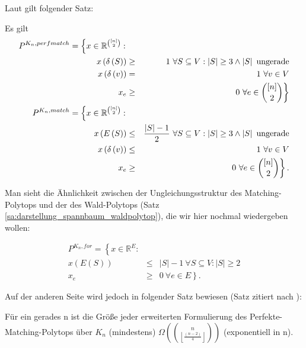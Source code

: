 \documentclass[10p,a4paper,BCOR = 12mm, DIV=15]{scrbook}
\begin{document}
Laut \citep{schrijver2003combinatorial} gilt folgender Satz:

\begin{Sa}
Es gilt
\begin{eqnarray*}
P^{K_n, perfmatch} = \left\{ x \in \mathbb{R}^{\left[n\right] \choose 2}: \right. \\
x\left(\delta\left(S\right)\right) & \geq & 1\ \forall S \subseteq V: \left|S\right| \geq 3 \wedge \left|S\right| \textnormal{ ungerade} \\
x\left(\delta\left(v\right)\right) & = & 1\ \forall v \in V \\
x_e & \geq & \left.0 \ \forall e \in {\left[n\right] \choose 2}\right\} \\
P^{K_n, match} = \left\{ x \in \mathbb{R}^{\left[n\right] \choose 2}: \right. \\
x\left(E\left(S\right)\right) & \leq & \frac{\left|S\right| - 1}{2}\ \forall S \subseteq V: \left|S\right| \geq 3 \wedge \left|S\right| \textnormal{ ungerade} \\
x\left(\delta\left(v\right)\right) & \leq & 1\ \forall v \in V \\
x_e & \geq & \left.0 \ \forall e \in {\left[n\right] \choose 2}\right\}.
\end{eqnarray*}
\end{Sa}

Man sieht die Ähnlichkeit zwischen der Ungleichungsstruktur des Matching-Poly\-tops und der des Wald-Polytops (Satz \ref{sa:darstellung_spannbaum_waldpolytop}), die wir hier nochmal wiedergeben wollen:

\begin{eqnarray*}
P^{K_n, for} =  \left\{ x \in \mathbb{R}^E: \right. & & \nonumber \\
x\left(E\left(S\right)\right) & \leq & \left|S\right|-1\ \forall S \subseteq V: \left|S\right| \geq 2 \\
x_e & \geq & \left. 0\ \forall e \in E \right\}. \nonumber
\end{eqnarray*}

Auf der anderen Seite wird jedoch in \cite{yannakakis:comb_lin} folgender Satz bewiesen (Satz zitiert nach \cite{optima:ext_form_comb_opt}):

\begin{Sa}
Für ein gerades n ist die Größe jeder erweiterten Formulierung des Per\-fek\-te-Matching-Polytops über $K_n$ (mindestens) $\Omega \left( 
{
n \choose
\left\lfloor\frac{ \left(n-2\right)}{4} \right\rfloor
}
\right)$ (exponentiell in n).
\end{Sa}
\end{document}
